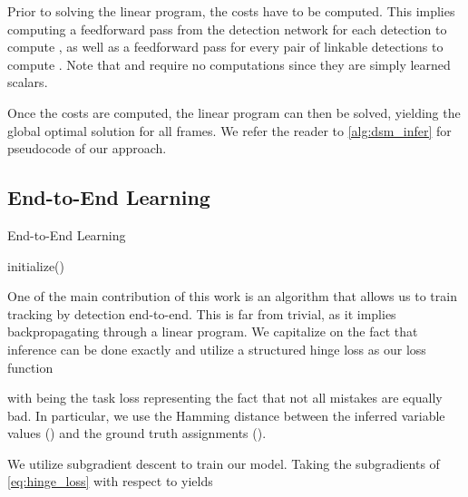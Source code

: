 \documentclass[letterpaper, 10 pt, conference]{ieeeconf}  \pdfminorversion=4
\begin{document}
Prior to solving the linear program, the costs have to be computed. This implies computing a feedforward pass from the detection network for each detection to compute , as well as a feedforward pass for every pair of linkable detections to compute . Note that  and  require no computations since they are simply learned scalars.

Once the costs are computed, the linear program can then be solved, yielding the global optimal solution for all frames.
We refer the reader to \autoref{alg:dsm_infer} for pseudocode of our approach.













\subsection{End-to-End Learning }
\label{sc:learn_dsm}

\LinesNumbered
\begin{algorithm}[t]
  \caption{End-to-End Learning\label{alg:dsm_learn}}
   initialize()\;
\end{algorithm}

One of the main contribution of this work is an algorithm that allows us to train tracking by detection end-to-end. This is far from trivial, as it implies backpropagating through a linear program.
We capitalize on the fact that inference can be done exactly and utilize a  structured hinge loss as our loss function

with   being the task loss representing the fact that not all mistakes are equally bad. In particular, we use the Hamming distance between the inferred variable values () and the ground truth assignments ().

We utilize subgradient descent to train our model. 
Taking the subgradients of \autoref{eq:hinge_loss} with respect to  yields
\end{document}
